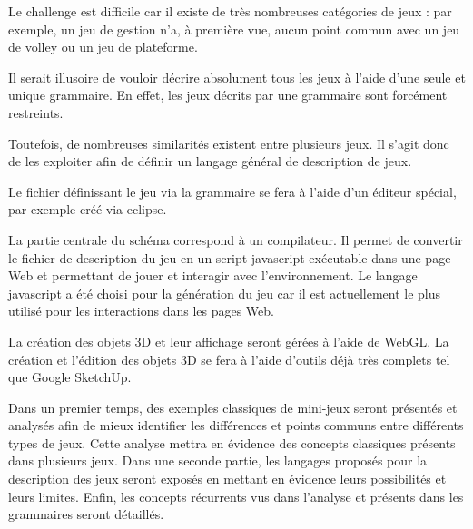 Le challenge est difficile car il existe de très nombreuses catégories de jeux : 
par exemple, un jeu de gestion n'a, à première vue, aucun point commun avec un jeu de volley ou un jeu de plateforme.

Il serait illusoire de vouloir décrire absolument tous les jeux à l'aide d'une seule et unique grammaire.
En effet, les jeux décrits par une grammaire sont forcément restreints.

Toutefois, de nombreuses similarités existent entre plusieurs jeux. Il s'agit donc de les exploiter afin de définir un langage général de description de jeux.

Le fichier définissant le jeu via la grammaire se fera à l'aide d'un éditeur spécial, par exemple créé via eclipse.

\vspace{0.5cm}

La partie centrale du schéma correspond à un compilateur.
Il permet de convertir le fichier de description du jeu en un script javascript exécutable dans une page Web et permettant de jouer et 
interagir avec l'environnement.
Le langage javascript a été choisi pour la génération du jeu car il est actuellement le plus utilisé pour les interactions dans les pages Web.

La création des objets 3D et leur affichage seront gérées à l'aide de WebGL.
La création et l'édition des objets 3D se fera à l'aide d'outils déjà très complets tel que Google SketchUp.

\vspace{0.5cm}

Dans un premier temps, des exemples classiques de mini-jeux seront présentés et analysés afin de mieux identifier
les différences et points communs entre différents types de jeux. Cette analyse mettra en évidence des concepts classiques
présents dans plusieurs jeux.
Dans une seconde partie, les langages proposés pour la description des jeux seront exposés en mettant en évidence leurs possibilités et leurs limites.
Enfin, les concepts récurrents vus dans l'analyse et présents dans les grammaires seront détaillés.